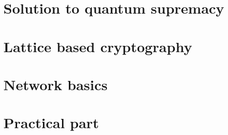 \chapter{Solution to quantum supremacy}


\chapter{Lattice based cryptography}


\chapter{Network basics}


\chapter{Practical part}


